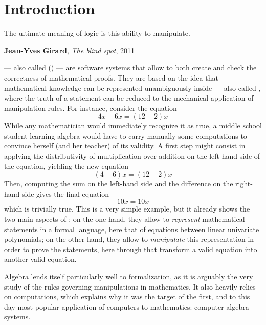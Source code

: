 \setchapterpreamble[u]{\margintoc}
\chapter{Introduction}

\epigraph{The ultimate meaning of logic is this ability to manipulate.}
{\textbf{Jean-Yves Girard}, \textit{The blind spot}, 2011}


 --- also called 
() --- are software systems that allow to both create and check
the correctness of mathematical proofs. They are based on the idea that
mathematical knowledge can be represented unambiguously inside  --- also called , where the truth of a
statement can be reduced to the mechanical application of  manipulation
rules. For instance, consider the equation
$$4x + 6x = (12 - 2)x$$ 
While any mathematician would immediately recognize it as true, a middle school
student learning algebra would have to carry manually some computations to
convince herself (and her teacher) of its validity. A first step might consist
in applying the distributivity of multiplication over addition on the left-hand
side of the equation, yielding the new equation
$$(4 + 6)x = (12 - 2)x$$
Then, computing the sum on the left-hand side and the difference on the
right-hand side gives the final equation
$$10x = 10x$$ which is trivially true. This is a very simple example, but it
already shows the two main aspects of : on the one hand,
they allow to \emph{represent} mathematical statements in a formal language,
here that of equations between linear univariate polynomials; on the other hand,
they allow to \emph{manipulate} this representation in order to prove the
statements, here through  that transform a valid equation
into another valid equation.

Algebra lends itself particularly well to formalization, as it is arguably the
very study of the rules governing  manipulations in mathematics. It also
heavily relies on computations, which explains why it was the target of the
first, and to this day most popular application of computers to mathematics:
computer algebra systems.

